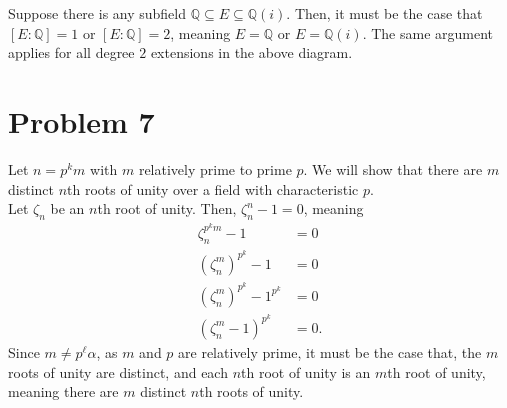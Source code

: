 \documentclass[11pt]{extarticle}
\newcommand{\Q}{\mathbb{Q}}
\begin{document}
  Suppose there is any subfield $\Q\subseteq E\subseteq \Q(i)$. Then, it must be the case that $[E:\Q] = 1$ or $[E:\Q] = 2$, meaning $E = \Q$ or $E = \Q(i)$. The same argument applies for all degree $2$ extensions in the above diagram. 
  \section{Problem 7}%
  Let $n= p^k m$ with $m$ relatively prime to prime $p$. We will show that there are $m$ distinct $n$th roots of unity over a field with characteristic $p$.\\

  Let $\zeta_n$ be an $n$th root of unity. Then, $\zeta_n^{n} - 1 = 0$, meaning
  \begin{align*}
    \zeta_n^{p^km}-1 &= 0\\
    \left(\zeta_n^{m}\right)^{p^k} - 1 &= 0\\
    \left(\zeta_n^m\right)^{p^k}- 1^{p^k} &= 0\\
    \left(\zeta_n^{m} - 1\right)^{p^k} &= 0.
  \end{align*}
  Since $m \neq p^{\ell}\alpha$, as $m$ and $p$ are relatively prime, it must be the case that, the $m$ roots of unity are distinct, and each $n$th root of unity is an $m$th root of unity, meaning there are $m$ distinct $n$th roots of unity.
\end{document}

